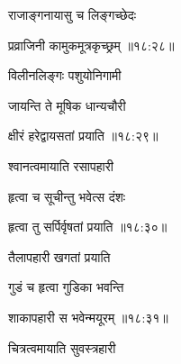 \nemslokac

{\devanagarifontbold राजाङ्गनायासु च लिङ्गच्छेदः }%
  \dontdisplaylinenum

\nemslokad

{\devanagarifontbold प्रव्राजिनी कामुकमूत्रकृच्छ्रम् {॥१८:२८॥} \veg\dontdisplaylinenum }%
 
\ujvers{}

\nemslokab

{\devanagarifontbold विलीनलिङ्गः पशुयोनिगामी  \danda\dontdisplaylinenum }%
 
\nemslokac

{\devanagarifontbold जायन्ति ते मूषिक धान्यचौरी }%
  \dontdisplaylinenum

\nemslokad

{\devanagarifontbold क्षीरं हरेद्वायसतां प्रयाति {॥१८:२९॥} \veg\dontdisplaylinenum }%
 
\ujvers{}

\nemslokab

{\devanagarifontbold श्वानत्वमायाति रसापहारी  \danda\dontdisplaylinenum }%
 
\nemslokac

{\devanagarifontbold हृत्वा च सूचीन्तु भवेत्स दंशः }%
  \dontdisplaylinenum

\nemslokad

{\devanagarifontbold हृत्वा तु सर्पिर्वृषतां प्रयाति {॥१८:३०॥} \veg\dontdisplaylinenum }%
 
\ujvers{}

\nemslokab

{\devanagarifontbold तैलापहारी खगतां प्रयाति  \danda\dontdisplaylinenum }%
 
\nemslokac

{\devanagarifontbold गुडं च हृत्वा गुडिका भवन्ति }%
  \dontdisplaylinenum

\nemslokad

{\devanagarifontbold शाकापहारी स भवेन्मयूरम् {॥१८:३१॥} \veg\dontdisplaylinenum }%
 
\ujvers{}

\nemslokab

{\devanagarifontbold चित्रत्वमायाति सुवस्त्रहारी  \danda\dontdisplaylinenum }%
 
